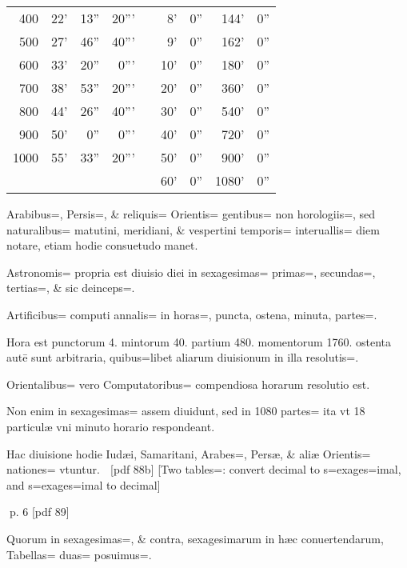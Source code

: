 \begin{parnumbers}
\begin{wraptable}{R}{0.6\textwidth}
\begin{table}[h]
\begin{tabular}{ @{}r@{}  @{}r@{}r@{}r@{}  c  @{}r @{} r @{} r@{} r@{}  }
  400
& 22'
& 13''
& 20'''
&
& 8'
& 0''
& 144'
& 0''
\\
  500
& 27'
& 46''
& 40'''
&
& 9'
& 0''
& 162'
& 0''
\\
  600
& 33'
& 20''
& 0'''
&
& 10'
& 0''
& 180'
& 0''
\\
  700
& 38'
& 53''
& 20'''
&
& 20'
& 0''
& 360'
& 0''
\\
  800
& 44'
& 26''
& 40'''
&
& 30'
& 0''
& 540'
& 0''
\\
  900
& 50'
& 0''
& 0'''
&
& 40'
& 0''
& 720'
& 0''
\\
  1000
& 55'
& 33''
& 20'''
&
& 50'
& 0''
& 900'
& 0''
\\

&
&
&
&
& 60'
& 0''
& 1080'
& 0''
\\
\cline{1-4} \cline{6-9}
\end{tabular}
\end{table}
\end{wraptable}


Arabibus=, Persis=, \& reliquis= Orientis= gentibus= non horologiis=, sed naturalibus= matutini, meridiani, \& vespertini temporis= interuallis= diem notare, etiam hodie consuetudo manet.

Astronomis= propria  est diuisio diei in sexagesimas= primas=, secundas=, tertias=, \& sic deinceps=.

Artificibus= computi annalis= in horas=, puncta, ostena, minuta, partes=.

Hora est punctorum 4. mintorum 40. partium 480. momentorum 1760. ostenta autē sunt arbitraria, quibus=libet aliarum diuisionum in illa resolutis=.

 Orientalibus= vero Computatoribus= compendiosa horarum resolutio est.

Non enim in sexagesimas= assem diuidunt, sed in 1080 partes= ita vt 18 particulæ vni minuto horario respondeant.

Hac diuisione hodie Iudæi, Samaritani, Arabes=, Persæ, \& aliæ Orientis= nationes= vtuntur.

[pdf 88b]
[Two tables=: convert decimal to s=exages=imal, and s=exages=imal to decimal]

\end{parnumbers}
\clearpage
p. 6 [pdf 89]

\begin{parnumbers}

 Quorum in sexagesimas=, \& contra, sexagesimarum in hæc conuertendarum, Tabellas= duas= posuimus=.

\end{parnumbers}

